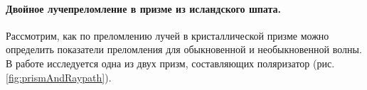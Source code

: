 \documentclass[a4paper, 12pt]{article}
\begin{document}
	\paragraph{Двойное лучепреломление в призме из исландского шпата.} Рассмотрим, как по преломлению лучей в кристаллической призме можно определить показатели преломления для обыкновенной и необыкновенной волны. В работе исследуется одна из двух призм, составляющих поляризатор (рис. \ref{fig:prismAndRaypath}).
	\begin{figure}[h]
	\centering
		\quad

\end{figure}
\end{document}
